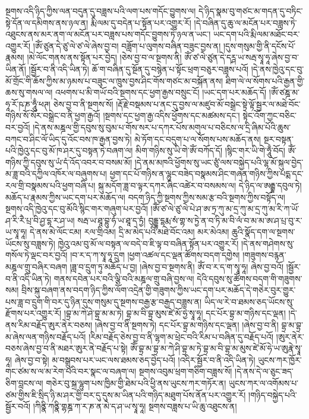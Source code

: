 སྔགས་འདི་ཉིད་ཀྱིས་ལན་བདུན་དུ་བཟླས་པའི་ལག་པས་གདོང་བྱུགས་ལ། དེ་ཉིད་སྣམ་བུ་གཙང་མ་གདན་དུ་བཏིང་སྟེ་དོན་ལ་དམིགས་ནས་ཉལ་ན། རྨི་ལམ་དུ་བདེན་པ་སྟོན་པར་འགྱུར་རོ། །དེ་བཞིན་དུ་ཆུ་ལ་མངོན་པར་བཟླས་ཏེ་འཐུངས་ནས་མར་ནག་ལ་མངོན་པར་བཟླས་པས་གདོང་བྱུགས་ཏེ་ཉལ་ན་ཡང་། ཡང་དག་པའི་རྨི་ལམ་མཐོང་བར་འགྱུར་རོ། །ཨོཾ་ཙུན་དེ་ཙུ་ལེ་ཙ་ལེ་ཞེས་བྱ་བ། བཟློག་པ་ལུགས་བཞིན་བཟུང་བྱས་ན། །དུས་གསུམ་གྱི་ནི་དངོས་པོ་རྣམས། །མེ་ལོང་གནས་ནས་སྟོན་པར་བྱེད། །ཅེས་བྱ་བ་ལ་སྔགས་ནི། ཨོཾ་ཙ་ལེ་ཙུན་དེ་དཪྴ་ཡ་སརྦ་སྭཱ་ཧཱ་ཞེས་བྱ་བ་ཡིན་ནོ། །སྦྱོར་བ་ནི་འདི་ཡིན་ཏེ། ཆོ་ག་བཞིན་དུ་སྔོན་དུ་བསྙེན་པ་སྟོང་ཕྲག་བཅུར་བཟླས་པའོ། །དེ་ནས་ཁྱེའུ་དང་བུ་མོ་གྲོང་གི་ཆོས་ཀྱིས་མ་ཉམས་པ་བཟུང་ལ་ཁྲུས་བྱས་ཤིང་གོས་གཙང་མ་བསྐོན་ནས། ཐིག་ལེ་ལ་སོགས་པའི་རྒྱན་གྱི་ཆས་སུ་གསལ་ལ། འཕགས་པ་མི་གཡོ་བའི་སྔགས་དང་ཕྱག་རྒྱས་བསྲུང་ངོ། །ཡང་དག་པར་མཆོད་དོ། །ཨོཾ་ཙཎྜ་མ་ཧཱ་རོ་ཥ་ཎ་ཧཱུྃ་ཕཊ། ཅེས་བྱ་བ་ནི་སྔགས་སོ། །རྡོ་རྗེ་བསྡམས་པ་ནང་དུ་བྱས་ལ་མཛུབ་མོ་བསྒྲེང་སྟེ་ལྟོ་སྦྱར་ལ་མཐེ་བོང་གཉིས་སོ་སོར་བསྒྲེང་བ་ནི་ཕྱག་རྒྱའོ། །སྔགས་དང་ཕྱག་རྒྱ་འདིས་ཕྱོགས་དང་མཚམས་དང་། སྟེང་འོག་ཀྱང་བཅིང་བར་བྱའོ། །དེ་ནས་མཎྜལ་གྱི་དབུས་སུ་བུམ་པ་གོས་སར་པ་དཀར་པོས་མགུལ་པ་བཅིངས་ལ་དྲི་ཞིམ་པོའི་ཆུས་བཀང་བ་ཤིང་ལོ་ཡིད་དུ་འོང་བས་ཁ་རྒྱན་བྱས་ཏེ། མེ་ཏོག་དང་བདུག་པ་ལ་སོགས་པས་མཆོད་ནས། སྔར་བསྟན་པའི་ཁྱེའུ་དང་བུ་མོ་ཁ་ཤར་དུ་བསྟན་ཏེ་བཞག་ལ། མིག་གཉིས་སུ་ཡི་གེ་ཨོཾ་བཀོད་དོ། །སྙིང་གར་ཡི་གེ་ཧཱུྃ་བོད། ཨོཾ་གཉིས་ཀྱི་དབུས་སུ་ཡཾ་དཾ་འོད་འབར་བ་བསམ་མོ། །དེ་ནམ་མཁའི་ཕྱོགས་སུ་ཡང་ཙུཾ་ལས་བསྐྱེད་པའི་ལྷ་མོ་སྐུལ་བྱེད་མ་ཟླ་བའི་དཀྱིལ་འཁོར་ལ་བཞུགས་པ། ཕྱག་དང་པོ་གཉིས་ན་ལྷུང་བཟེད་བསྣམས་ཤིང་གཞན་གཉིས་ཀྱིས་པདྨ་དང་རལ་གྲི་བསྣམས་པའི་ཕྱག་བཞི་པ། སྐུ་མདོག་ཟླ་བ་ལྟར་དཀར་ཞིང་འཚེར་བ་བསམས་ལ། དེ་ཉིད་ལ་ཨརྒྷ་དབུལ་ཏེ། མཆོད་པ་རྣམས་ཀྱིས་ཡང་དག་པར་མཆོད་ལ། བདག་ཉིད་ཀྱི་སྔགས་ཀྱིས་སམ་རྩ་བའི་སྔགས་ཀྱིས་བསྟོད་ལ། སྔགས་འདི་ཁྱེའུ་དང་བུ་མོའི་སྙིང་གར་གཞུག་པར་བྱའོ། །ཨོཾ་ཙ་ལེ་ཙུ་ལེ་པེ་ཤ་ཨ་ཏྲ་ཀུ་མ་དྲ་ཀུ་མ་དྲ་ཀུ་མ་རི་ཀ་ཡོ་ཤ་རི་རཻ་པྲ་བི་ཤྱ་དྷ་ར་ཤ་ཡ། སརྦ་ཡ་ཐཱ་བྷུ་ཧཾ་ཡ་ཐཱ་ད་ཏྱཾ། བུདྡྷ་དྷརྨ་སཾ་གྷ་ས་ཏྱེ་ན་བ་ཏི་མ་བི་ལཾ་བ་མ་མ་ཨ་ཤ་པྲ་བུ་ར་ཡ་སྭཱ་ཧཱ། དེ་ནས་མེ་ལོང་ངམ། རལ་གྲིའམ། དྲི་མ་མེད་པའི་མཐེ་བོང་འམ། མར་མེའམ། ཆུའི་སྣོད་དག་ལ་སྔགས་ཡོངས་སུ་བཟླས་ཏེ། ཁྱེའུ་འམ་བུ་མོ་ལ་བསྟན་ལ་བདེ་བ་ཇི་ལྟ་བ་བཞིན་སྟོན་པར་འགྱུར་རོ། །དེ་ནས་གཤེགས་སུ་གསོལ་ཏེ་ལྡང་བར་བྱའོ། །བ་ར་ད་ཀ་སྭཱ་ཧཱ་དྲུག །ཕྱག་འཚལ་དང་ལྡན་ཚོགས་བདག་དགྱེས། །གཟུགས་བརྙན་མཎྜལ་གྲུ་བཞིར་བཞག །ཟླ་བ་དྲུག་ཏུ་མཆོད་པ་བྱ། །ཞེས་བྱ་བ་སྔགས་ནི། ཨོཾ་བ་ར་ད་ག་སྭཱ་ཧཱ། ཞེས་བྱ་བའོ། །སྦྱོར་བ་ནི་འདི་ཡིན་ཏེ། གནས་དབེན་པར་བའི་ལྕི་བའི་མཎྜལ་གྲུ་བཞི་བྱས་ལ། དེའི་དབུས་སུ་ཚོགས་བདག་གི་གཟུགས་སམ། བྲིས་སྐུ་བཞག་ནས་བདག་ཉིད་ཀྱིས་ལོག་འདྲེན་གྱི་གཟུགས་ཀྱིས་ཡང་དག་པར་མཆོད་དེ་གཅེར་བུར་གྱུར་པས་ཟླ་བ་དྲུག་གི་བར་དུ་ཉིན་དུས་གསུམ་དུ་སྔགས་བརྒྱ་རྩ་བརྒྱད་བཟླས་ན། ཡིད་ལ་རེ་བ་ཐམས་ཅད་ཡོངས་སུ་རྫོགས་པར་འགྱུར་རོ། །བྷྲ་མ་ཀེ་ཤེ་བྷྲ་མ་མ་ཏེ། བྷྲ་མ་བི་བྷྲ་མུས་ཛེ་མོ་ཧྱེ་སྭཱ་ཧཱ། དང་པོར་བྷྲ་མ་གཉིས་དང་ལྡན། །དེ་ནས་རིམ་བརྗོད་ཨུར་ནེར་བཅས། །ཞེས་བྱ་བ་ནི་སྔགས་ཏེ། དང་པོར་བྷྲ་མ་གཉིས་དང་ལྡན། །ཞེས་བྱ་བ་ནི། བྷྲ་མ་བྷྲ་མ་ཞེས་ལན་གཉིས་བརྗོད་པའོ། །རིམ་བརྗོད་ཅེས་བྱ་བ་ནི་ལྷག་མ་ཕྲེང་བའི་རིམ་པ་བཞིན་དུ་བརྗོད་པའོ། །ཨུར་ནེར་བཅས་ཞེས་བྱ་བ་ནི་མཐར་ཨུར་ནེ་བརྗོད་པ་སྟེ། ཨོཾ་བྷྲ་མ་བྷྲ་མ་ཀེ་ཤི་བྷྲ་མ་ཏེ་བྷྲ་མ་བི་བྷྲ་མ་མུས་ཛེ་མོ་ཧེ་ཡ་ཨུརྣེ་སྭཱ་ཧཱ། ཞེས་བྱ་བ་སྟེ། མ་བསྒྲུབས་པར་ཡང་ལས་ཐམས་ཅད་བྱེད་པའོ། །འདིར་སྦྱོར་བ་ནི་འདི་ཡིན་ཏེ། ཡུངས་ཀར་ཁྱོར་གང་ཙམ་ས་ལ་མ་རེག་པའི་བར་སྣང་ལ་བཞག་ལ། སྔགས་འབུམ་ཕྲག་གཅིག་བཟླས་སོ། །དེ་ནས་དེ་ལ་ཅུང་ཟད་ཅིག་བླངས་ལ། གཅེར་བུ་སྐྲ་ལྷུག་པས་ཁྱིམ་གྱི་ཐེམ་པའི་ཕྱི་ནས་ཡུངས་ཀར་གཏོར་ན། ཡུངས་ཀར་ལ་འགོམས་པ་ཙམ་གྱིས་ཇི་སྲིད་ཉི་མ་ཤར་གྱི་བར་དུ་དུས་མ་ཡིན་པའི་གཉིད་མཐུག་པོས་ནོན་པར་འགྱུར་རོ། །གཉིད་བསྐྱེད་པའི་སྦྱོར་བའོ། །ཀིནྣི་ཀནྣི་གྷཎྜ་ཀ་ར་ཎ་ན་མེ་ད་ཤ་ཡ་སྭཱ་ཧཱ། སྔགས་བཟླས་པ་ཡི་ཆུ་འཐུངས་ན། 
